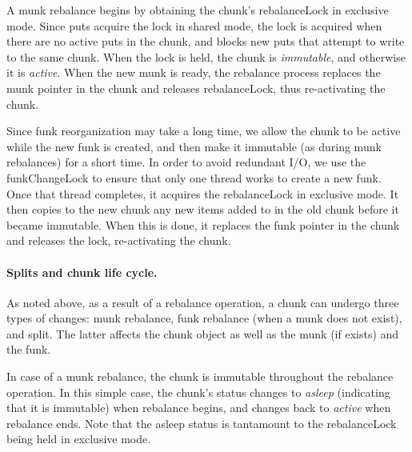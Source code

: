 A munk rebalance begins by obtaining the chunk's rebalanceLock in exclusive mode. Since puts acquire the lock in shared mode,
the lock is acquired when there are no active puts in the chunk, and blocks new puts that attempt to write to the same chunk. 
When the lock is held, the chunk is \emph{immutable}, and otherwise it is \emph{active}. 
When the new munk is ready, the rebalance process replaces the munk pointer in the chunk and releases rebalanceLock, thus 
re-activating the chunk.

Since funk reorganization may take a long time, we allow the chunk to be active while the new funk is created,
and then make it immutable (as during munk rebalances) for a short time. In order to avoid redundant I/O, 
we use the funkChangeLock to ensure that only one thread works to create a new funk.  Once that thread
completes, it acquires the rebalanceLock in exclusive mode.
It then copies to the new chunk any new items added to   in the old chunk before it became immutable. 
When this is done, it replaces the funk pointer in the chunk and releases the lock, re-activating the chunk.

\paragraph{Splits and chunk life cycle.}

As noted above, as a result of a rebalance operation, a chunk can undergo three types of changes: munk rebalance, funk rebalance
(when a munk does not exist), and split. The latter affects the chunk object as well as the munk (if exists) and the funk.

In case of a munk rebalance, the chunk is immutable throughout the rebalance operation.
In this simple case, the chunk's status changes to \emph{asleep} (indicating that it is immutable)
when rebalance begins, and changes back to \emph{active} when rebalance ends. 
Note that the asleep status is tantamount to the rebalanceLock being held in exclusive mode.

